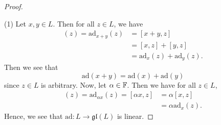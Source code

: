 \documentclass[a4paper]{article}
\begin{document}
\begin{enumerate}
\begin{proof}
\begin{enumerate}
    \end{enumerate}
    (1) Let \( x,y \in L  \). Then for all \( z \in L  \), we have 
    \begin{align*}
        [\text{ad}(x +y) ](z) = \text{ad}_{x + y}(z) &= [x+ y, z ]      \\
                                                     &= [x,z] + [y,z] \\
                                                     &= \text{ad}_x(z) + \text{ad}_y(z).  
    \end{align*}
    Then we see that 
    \[ \text{ad}(x+y) = \text{ad}(x) + \text{ad}(y)      \]
    since \( z \in L  \) is arbitrary. Now, let \( \alpha \in \mathbb{F}  \). Then we have for all \( z \in L  \), 
    \begin{align*}
        [\text{ad}(\alpha x ) ](z) = \text{ad}_{\alpha x } (z) = [\alpha x , z ] &= \alpha [x,z]  \\
                                                                                 &= \alpha \text{ad}_x(z). 
    \end{align*}
    Hence, we see that \( \text{ad}: L \to \mathfrak{gl}(L)  \) is linear.


\end{proof}
\end{enumerate}
\end{document}
